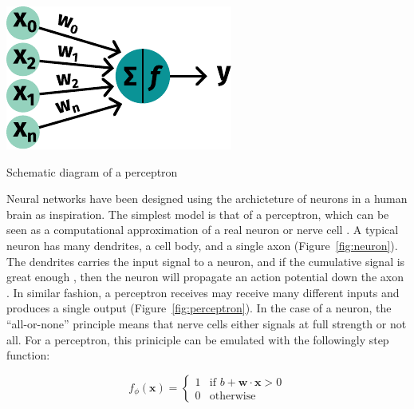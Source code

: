 \begin{marginfigure}%
	\includegraphics[width=\linewidth]{graphics/perceptron}
	\caption{Schematic diagram of a perceptron}
    \label{fig:perceptron}
\end{marginfigure}


Neural networks have been designed
using the archicteture of neurons in a human brain as inspiration.
The simplest model is that of a perceptron, 
which can be seen as a computational approximation
of a real neuron or nerve cell%
\autocite{charniakIntroduction2019}.
A typical neuron has many dendrites, a cell body, and a single axon 
(Figure~\ref{fig:neuron}).
The dendrites carries the input signal to a neuron,
and if the cumulative signal is great enough%
, 
then the neuron will propagate an action potential down the axon%
\autocite{seifterConcepts2005}.
In similar fashion, a perceptron receives may receive many different inputs
and produces a single output (Figure~\ref{fig:perceptron}).
In the case of a neuron, the \enquote{all-or-none} principle means
that nerve cells either signals at full strength or not all.
For a perceptron, this priniciple can be emulated
with the followingly step function:

\begin{equation}
    f_{\phi}(\mathbf{x})  = 
        \begin{cases}
            1 & \text{if } b + \mathbf{w} \cdot \mathbf{x} > 0\\
            0 & \text{otherwise}
        \end{cases}
\end{equation}

